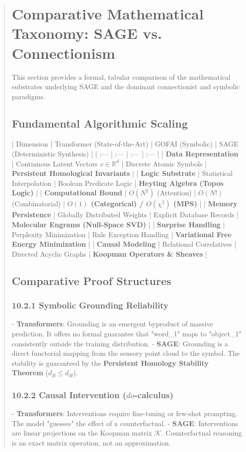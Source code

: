 \documentclass[10pt,twocolumn,letterpaper]{article}
\begin{document}
\begin{abstract}
\section{Comparative Mathematical Taxonomy: SAGE vs. Connectionism}

This section provides a formal, tabular comparison of the mathematical substrates underlying SAGE and the dominant connectionist and symbolic paradigms.

\subsection{Fundamental Algorithmic Scaling}

| Dimension | Transformer (State-of-the-Art) | GOFAI (Symbolic) | SAGE (Deterministic Synthesis) |
| :--- | :--- | :--- | :--- |
| \textbf{Data Representation} | Continuous Latent Vectors $v \in \mathbb{R}^d$ | Discrete Atomic Symbols | \textbf{Persistent Homological Invariants} |
| \textbf{Logic Substrate} | Statistical Interpolation | Boolean Predicate Logic | \textbf{Heyting Algebra (Topos Logic)} |
| \textbf{Computational Bound} | $O(N^2)$ (Attention) | $O(N!)$ (Combinatorial) | \textbf{$O(1)$ (Categorical) / $O(\chi^3)$ (MPS)} |
| \textbf{Memory Persistence} | Globally Distributed Weights | Explicit Database Records | \textbf{Molecular Engrams (Null-Space SVD)} |
| \textbf{Surprise Handling} | Perplexity Minimization | Rule Exception Handling | \textbf{Variational Free Energy Minimization} |
| \textbf{Causal Modeling} | Relational Correlatives | Directed Acyclic Graphs | \textbf{Koopman Operators & Sheaves} |

\subsection{Comparative Proof Structures}

\subsubsection{10.2.1 Symbolic Grounding Reliability}
- \textbf{Transformers}: Grounding is an emergent byproduct of massive prediction. It offers no formal guarantee that "word_1" maps to "object_1" consistently outside the training distribution.
- \textbf{SAGE}: Grounding is a direct functorial mapping from the sensory point cloud to the symbol. The stability is guaranteed by the \textbf{Persistent Homology Stability Theorem} ($d_B \le d_H$).

\subsubsection{10.2.2 Causal Intervention ($do$-calculus)}
- \textbf{Transformers}: Interventions require fine-tuning or few-shot prompting. The model "guesses" the effect of a counterfactual.
- \textbf{SAGE}: Interventions are linear projections on the Koopman matrix $\mathcal{K}$. Counterfactual reasoning is an exact matrix operation, not an approximation.


\end{abstract}
\end{document}
